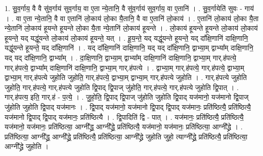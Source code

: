 \documentclass[17pt]{extarticle}
\begin{document}
1. सु॒व॒र्गाय॒ वै वै सु॑व॒र्गाय॑ सुव॒र्गाय॒ वा ए॒ता न्ये॒तानि॒ वै सु॑व॒र्गाय॑ सुव॒र्गाय॒ वा ए॒तानि॑ । . सु॒व॒र्गायेति॑ सुवः - गाय॑ । . वा ए॒ता न्ये॒तानि॒ वै वा ए॒तानि॑ लो॒काय॑ लो॒का यै॒तानि॒ वै वा ए॒तानि॑ लो॒काय॑ । . ए॒तानि॑ लो॒काय॑ लो॒का यै॒ता न्ये॒तानि॑ लो॒काय॑ हूयन्ते हूयन्ते लो॒का यै॒ता न्ये॒तानि॑ लो॒काय॑ हूयन्ते । . लो॒काय॑ हूयन्ते हूयन्ते लो॒काय॑ लो॒काय॑ हूयन्ते॒ यद् यद्धू॑यन्ते लो॒काय॑ लो॒काय॑ हूयन्ते॒ यत् । . हू॒य॒न्ते॒ यद् यद्धू॑यन्ते हूयन्ते॒ यद् दा᳚क्षि॒णानि॑ दाक्षि॒णानि॒ यद्धू॑यन्ते हूयन्ते॒ यद् दा᳚क्षि॒णानि॑ । . यद् दा᳚क्षि॒णानि॑ दाक्षि॒णानि॒ यद् यद् दा᳚क्षि॒णानि॒ द्वाभ्या॒म् द्वाभ्या᳚म् दाक्षि॒णानि॒ यद् यद् दा᳚क्षि॒णानि॒ द्वाभ्या᳚म् । . दा॒क्षि॒णानि॒ द्वाभ्या॒म् द्वाभ्या᳚म् दाक्षि॒णानि॑ दाक्षि॒णानि॒ द्वाभ्या॒म् गार्.ह॑पत्ये॒ गार्.ह॑पत्ये॒ द्वाभ्या᳚म् दाक्षि॒णानि॑ दाक्षि॒णानि॒ द्वाभ्या॒म् गार्.ह॑पत्ये । . द्वाभ्या॒म् गार्.ह॑पत्ये॒ गार्.ह॑पत्ये॒ द्वाभ्या॒म् द्वाभ्या॒म् गार्.ह॑पत्ये जुहोति जुहोति॒ गार्.ह॑पत्ये॒ द्वाभ्या॒म् द्वाभ्या॒म् गार्.ह॑पत्ये जुहोति । . गार्.ह॑पत्ये जुहोति जुहोति॒ गार्.ह॑पत्ये॒ गार्.ह॑पत्ये जुहोति द्वि॒पाद् द्वि॒पाज् जु॑होति॒ गार्.ह॑पत्ये॒ गार्.ह॑पत्ये जुहोति द्वि॒पात् । . गार्.ह॑पत्य॒ इति॒ गार्.ह॑ - प॒त्ये॒ । . जु॒हो॒ति॒ द्वि॒पाद् द्वि॒पाज् जु॑होति जुहोति द्वि॒पाद् यज॑मानो॒ यज॑मानो द्वि॒पाज् जु॑होति जुहोति द्वि॒पाद् यज॑मानः । . द्वि॒पाद् यज॑मानो॒ यज॑मानो द्वि॒पाद् द्वि॒पाद् यज॑मानः॒ प्रति॑ष्ठित्यै॒ प्रति॑ष्ठित्यै॒ यज॑मानो द्वि॒पाद् द्वि॒पाद् यज॑मानः॒ प्रति॑ष्ठित्यै । . द्वि॒पादिति॑ द्वि - पात् । . यज॑मानः॒ प्रति॑ष्ठित्यै॒ प्रति॑ष्ठित्यै॒ यज॑मानो॒ यज॑मानः॒ प्रति॑ष्ठित्या॒ आग्नी᳚द्ध्र॒ आग्नी᳚द्ध्रे॒ प्रति॑ष्ठित्यै॒ यज॑मानो॒ यज॑मानः॒ प्रति॑ष्ठित्या॒ आग्नी᳚द्ध्रे । . प्रति॑ष्ठित्या॒ आग्नी᳚द्ध्र॒ आग्नी᳚द्ध्रे॒ प्रति॑ष्ठित्यै॒ प्रति॑ष्ठित्या॒ आग्नी᳚द्ध्रे जुहोति जुहो॒ त्याग्नी᳚द्ध्रे॒ प्रति॑ष्ठित्यै॒ प्रति॑ष्ठित्या॒ आग्नी᳚द्ध्रे जुहोति । \newline
\end{document}

